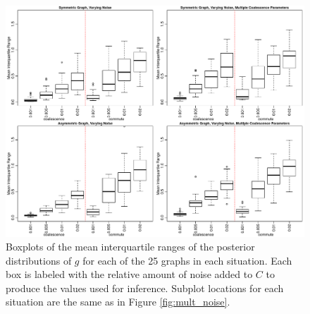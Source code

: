 \documentclass{article}
\begin{document}
\begin{figure}
\centering
\includegraphics[scale=.6]{figs/mult_noise_iqr}
\caption{Boxplots of the mean interquartile ranges of the posterior distributions of $g$
for each of the 25 graphs in each situation.
Each box is labeled with the relative amount of noise added to $C$ to produce the values used for inference.
Subplot locations for each situation are the same as in Figure \ref{fig:mult_noise}.
}
\label{fig:mult_noise_iqr}
\end{figure}
\end{document}
